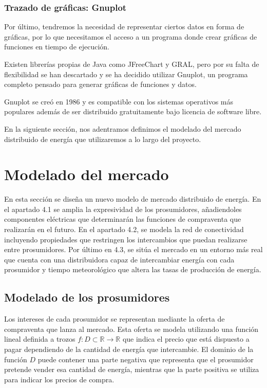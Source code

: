 \documentclass[12pt,a4paper,openright,oneside]{article}
\newcommand{\R}{\mathbb{R}}
\numberwithin{equation}{section}
\theoremstyle{definition}
\begin{document}
\subsubsection{Trazado de gráficas: Gnuplot}
Por último, tendremos la necesidad de representar ciertos datos en forma de gráficas, por lo que necesitamos el acceso a un programa donde crear gráficas de funciones en tiempo de ejecución.

Existen librerías propias de Java como JFreeChart y GRAL, pero por su falta de flexibilidad se han descartado y se ha decidido utilizar Gnuplot, un programa completo pensado para generar gráficas de funciones y datos.

Gnuplot se creó en 1986 y es compatible con los sistemas operativos más populares además de ser distribuido gratuitamente bajo licencia de software libre.


En la siguiente sección, nos adentramos definimos el modelado del mercado distribuido de energía que utilizaremos a lo largo del proyecto.

\newpage




\section{Modelado del mercado}

En esta sección se diseña un nuevo modelo de mercado distribuido de energía. En el apartado 4.1 se amplia la expresividad de los prosumidores, añadiendoles componentes eléctricas que determinarán las funciones de compraventa que realizarán en el futuro. En el apartado 4.2, se modela la red de conectividad incluyendo propiedades que restringen los intercambios que puedan realizarse entre prosumidores. Por último en 4.3, se sitúa el mercado en un entorno más real que cuenta con una distribuidora capaz de intercambiar energía con cada prosumidor y tiempo meteorológico que altera las tasas de producción de energía. 

\subsection{Modelado de los prosumidores}

Los intereses de cada prosumidor se representan mediante la oferta de compraventa que lanza al mercado. Esta oferta se modela utilizando una función lineal definida a trozos $f:D \subset \R \to \R$ que indica el precio que está dispuesto a pagar dependiendo de la cantidad de energía que intercambie. El dominio de la función $D$ puede contener una parte negativa que representa que el prosumidor pretende vender esa cantidad de energía, mientras que la parte positiva se utiliza para indicar los precios de compra.
\end{document}
